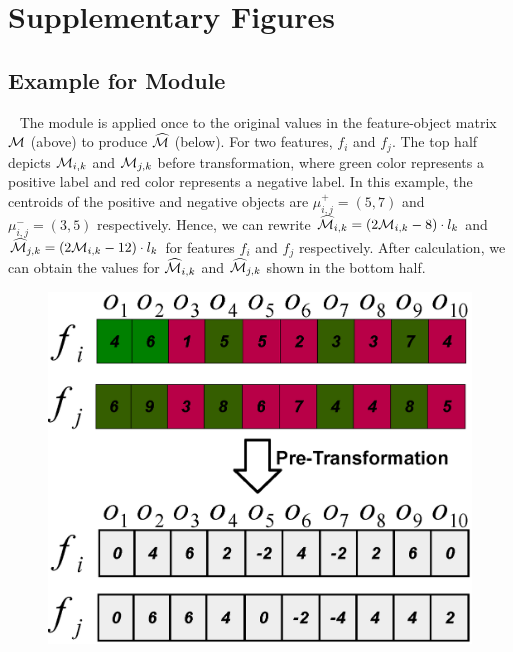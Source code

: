 \section{Supplementary Figures}

\subsection{Example for \trans Module}~\label{appF:transform}
The \trans module is applied once to the original values in the feature-object matrix ${\mathcal{M}}$ (above) to produce $\widehat{{\mathcal{M}}}$ (below). For two features, $f_i$ and $f_j$. The top half depicts ${\mathcal{M}}_{i,k}$ and ${\mathcal{M}}_{j,k}$ before transformation, where green color represents a positive label and red color represents a negative label. In this example, the centroids of the positive and negative objects are $\mu_{i,j}^+=(5,7)$ and $\mu_{i,j}^-=(3,5)$ respectively. Hence, we can rewrite $\widehat{{\mathcal{M}}}_{i,k} = (2{\mathcal{M}}_{i,k}-8)\cdot l_k$ and $\widehat{{\mathcal{M}}}_{j,k} = (2{\mathcal{M}}_{i,k}-12)\cdot l_k$ for features $f_i$ and $f_j$ respectively. After calculation, we can obtain the values for $\widehat{{\mathcal{M}}}_{i,k}$ and $\widehat{{\mathcal{M}}}_{j,k}$ shown in the bottom half.
\begin{figure}[!htb]
\centering %
\vspace{-5mm}
\includegraphics[width=.235\textwidth]{fig/transformation.eps}
\label{fig:trans_term}
\end{figure}


